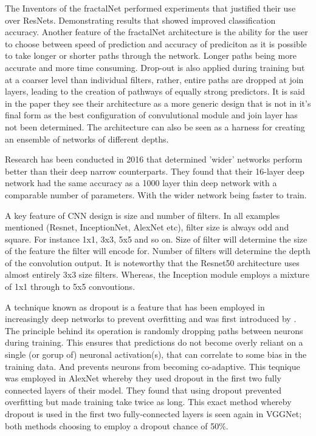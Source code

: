   \par
  The Inventors of the fractalNet performed experiments that justified their use over ResNets. Demonstrating results that showed improved classification accuracy. Another feature of the fractalNet architecture is the ability for the user to choose between speed of prediction and accuracy of prediciton as it is possible to take longer or shorter paths through the network. Longer paths being more accurate and more time consuming. Drop-out is also applied during training but at a coarser level than individual filters, rather, entire paths are dropped at join layers, leading to the creation of pathways of equally strong predictors.
  It is said in the paper they see their architecture as a more generic design that is not in it's final form as the best configuration of convulutional module and join layer has not been determined. The architecture can also be seen as a harness for creating an ensemble of networks of different depths.
  \par
  Research has been conducted in 2016 \cite{Zagoruyko} that determined 'wider' networks perform better than their deep narrow counterparts. They found that their 16-layer deep network had the same accuracy as a 1000 layer thin deep network with a comparable number of parameters. With the wider network being faster to train.
  \par
  A key feature of CNN design is size and number of filters. In all examples mentioned (Resnet, InceptionNet, AlexNet etc), filter size is always odd and square. For instance 1x1, 3x3, 5x5 and so on. Size of filter will determine the size of the feature the filter will encode for. Number of filters will determine the depth of the convolution output. It is noteworthy that the Resnet50 architecture \cite{He} uses almost entirely 3x3 size filters. Whereas, the Inception module employs a mixture of 1x1 through to 5x5 convoutions.
  \par
  A technique known as dropout is a feature that has been employed in increasingly deep networks to prevent overfitting and was first introduced by \cite{Srivastava2014}. The principle behind its operation is randomly dropping paths between neurons during training. This ensures that predictions do not become overly reliant on a single (or gorup of) neuronal activation(s), that can correlate to some bias in the training data. And prevents neurons from becoming co-adaptive. This teqnique was employed in AlexNet \cite{Krizhevsky} whereby they used dropout in the first two fully connected layers of their model. They found that using dropout prevented overfitting but made training take twice as long. This exact method whereby dropout is used in the first two fully-connected layers is seen again in VGGNet\cite{Simonyan2015}; both methods choosing to employ a dropout chance of 50\%. %
